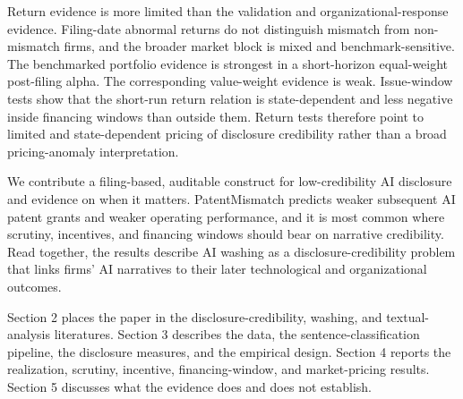 Return evidence is more limited than the validation and organizational-response evidence. Filing-date abnormal returns do not distinguish mismatch from non-mismatch firms, and the broader market block is mixed and benchmark-sensitive. The benchmarked portfolio evidence is strongest in a short-horizon equal-weight post-filing alpha. The corresponding value-weight evidence is weak. Issue-window tests show that the short-run return relation is state-dependent and less negative inside financing windows than outside them. Return tests therefore point to limited and state-dependent pricing of disclosure credibility rather than a broad pricing-anomaly interpretation.

We contribute a filing-based, auditable construct for low-credibility AI disclosure and evidence on when it matters. PatentMismatch predicts weaker subsequent AI patent grants and weaker operating performance, and it is most common where scrutiny, incentives, and financing windows should bear on narrative credibility. Read together, the results describe AI washing as a disclosure-credibility problem that links firms' AI narratives to their later technological and organizational outcomes.

Section 2 places the paper in the disclosure-credibility, washing, and textual-analysis literatures. Section 3 describes the data, the sentence-classification pipeline, the disclosure measures, and the empirical design. Section 4 reports the realization, scrutiny, incentive, financing-window, and market-pricing results. Section 5 discusses what the evidence does and does not establish.

